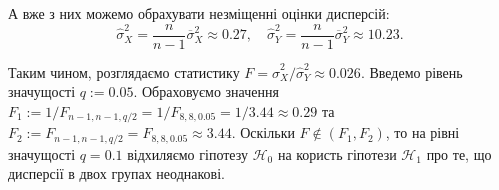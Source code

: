 \documentclass{../hw_template}
\begin{document}
А вже з них можемо обрахувати незміщенні оцінки дисперсій:
\begin{equation*}
    \hat{\sigma}_X^2 = \frac{n}{n-1}\overline{\sigma}_X^2 \approx 0.27, \quad \hat{\sigma}_Y^2 = \frac{n}{n-1}\overline{\sigma}_Y^2 \approx 10.23.
\end{equation*}

Таким чином, розглядаємо статистику $F=\hat{\sigma}_X^2/\hat{\sigma}_Y^2 \approx
0.026$. Введемо рівень значущості $q := 0.05$. Обраховуємо значення $F_1 :=
1/F_{n-1,n-1,q/2} = 1/F_{8,8,0.05} = 1/3.44 \approx 0.29$ та $F_2 :=
F_{n-1,n-1,q/2} = F_{8,8,0.05} \approx 3.44$. Оскільки $F \not\in (F_1,F_2)$, то 
на рівні значущості $q=0.1$ відхиляємо гіпотезу $\mathcal{H}_0$ на користь гіпотези
$\mathcal{H}_1$ про те, що дисперсії в двох групах неоднакові.
\end{document}
